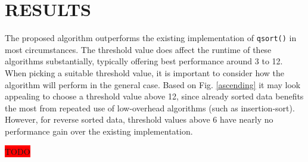 \documentclass[12pt, conference]{ieeeconf}
\newcommand{\todo}{\colorbox{red}{TODO}}
\begin{document}
\section{RESULTS}

The proposed algorithm outperforms the existing implementation of \verb|qsort()|
in most circumstances. The threshold value does affect the runtime of these
algorithms substantially, typically offering best performance around 3 to 12.
When picking a suitable threshold value, it is important to consider how the
algorithm will perform in the general case. Based on Fig. \ref{ascending} it may
look appealing to choose a threshold value above 12, since already sorted data
benefits the most from repeated use of low-overhead algorithms (such as
insertion-sort). However, for reverse sorted data, threshold values above 6 have
nearly no performance gain over the existing implementation.

\todo
\end{document}
